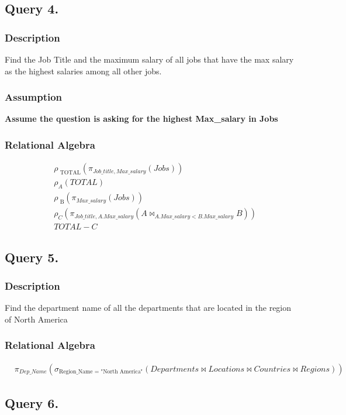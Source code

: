 \documentclass[a4paper]{article}
\begin{document}
\subsection{Query 4.}
\subsubsection{Description}
Find the Job Title and the maximum salary of all jobs that have the max salary as
the highest salaries among all other jobs.
\subsubsection{Assumption}
\textbf{Assume the question is asking for the highest Max\_salary in Jobs}
\subsubsection{Relational Algebra}
\begin{align*}
&\rho_{\text{ TOTAL}} (\pi_{Job\_title, Max\_salary} (Jobs)) \\
&\rho_{A} (TOTAL) \\
&\rho_{\text{ B}} (\pi_{Max\_salary} (Jobs)) \\
&\rho_{C} (\pi_{Job\_title, A.Max\_salary} (A \bowtie_{A.Max\_salary < B.Max\_salary} B)) \\
& TOTAL - C
\end{align*}

\newpage
\subsection{Query 5.}
\subsubsection{Description}
Find the department name of all the departments that are located in the region of
North America
\subsubsection{Relational Algebra}
\begin{align*}
    &\pi_{Dep\_Name} (\sigma_{\text{Region\_Name = "North America"}} (Departments \bowtie Locations \bowtie Countries \bowtie Regions) )
\end{align*}

\subsection{Query 6.}
\end{document}
